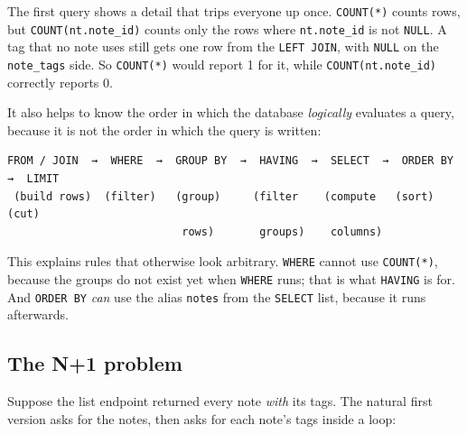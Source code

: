 \noindent{}The first query shows a detail that trips everyone up once. \texttt{COUNT(*)} counts rows, but \texttt{COUNT(nt.note\_id)} counts only the rows where \texttt{nt.note\_id} is not \texttt{NULL}. A tag that no note uses still gets one row from the \texttt{LEFT\ JOIN}, with \texttt{NULL} on the \texttt{note\_tags} side. So \texttt{COUNT(*)} would report 1 for it, while \texttt{COUNT(nt.note\_id)} correctly reports 0.

It also helps to know the order in which the database \emph{logically} evaluates a query, because it is not the order in which the query is written:

\begin{outputbox}[short]
\begin{Verbatim}[fontsize=\codesize, breaklines, breakanywhere, breaksymbolleft={\tiny\textcolor{muted}{$\hookrightarrow$}}]
FROM / JOIN  →  WHERE  →  GROUP BY  →  HAVING  →  SELECT  →  ORDER BY  →  LIMIT
 (build rows)  (filter)   (group)     (filter    (compute   (sort)       (cut)
                           rows)       groups)    columns)
\end{Verbatim}
\end{outputbox}

\noindent{}This explains rules that otherwise look arbitrary. \texttt{WHERE} cannot use \texttt{COUNT(*)}, because the groups do not exist yet when \texttt{WHERE} runs; that is what \texttt{HAVING} is for. And \texttt{ORDER\ BY} \emph{can} use the alias \texttt{notes} from the \texttt{SELECT} list, because it runs afterwards.

\subsection*{The N+1 problem}\label{33-logic-execution:the-n1-problem}

Suppose the list endpoint returned every note \emph{with} its tags. The natural first version asks for the notes, then asks for each note's tags inside a loop:


